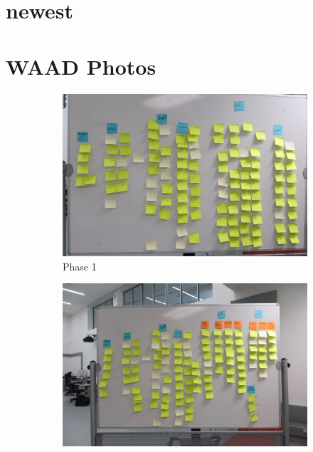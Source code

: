 \documentclass[12pt]{article} %
\begin{document}
\section{newest} %
\label{sec:newest}


\section{WAAD Photos} %
  \begin{figure}[H]
    \begin{subfigure}{.5\linewidth}
      \centering
      \includegraphics[width=0.95\linewidth]{WAAD_version1}
      \caption{Phase 1}
      \label{fig:WAAD_version1}
    \end{subfigure}%
    \begin{subfigure}{.5\linewidth}
      \centering
      \includegraphics[width=0.95\linewidth]{WAAD_version2}

\end{subfigure}
\end{figure}
\end{document}
